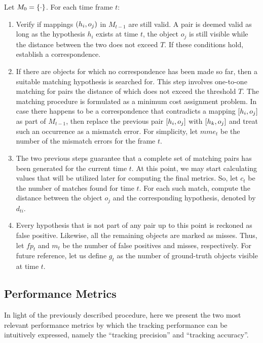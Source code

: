 Let $M_0 = \left\{ {\cdot} \right\}$. For each time frame $t$:
\begin{enumerate}
    \item Verify if mappings $\left( {h_i, o_j} \right)$ in $M_{t - 1}$ are still valid. A pair is deemed valid as long as the hypothesis $h_i$ exists at time $t$, the object $o_j$ is still visible while the distance between the two does not exceed $T$. If these conditions hold, establish a correspondence.
    \item If there are objects for which no correspondence has been made so far, then a suitable matching hypothesis is searched for. This step involves one-to-one matching for pairs the distance of which does not exceed the threshold $T$. The matching procedure is formulated as a minimum cost assignment problem. In case there happens to be a correspondence that contradicts a mapping $\left[ {h_i, o_j} \right]$ as part of $M_{t - 1}$, then replace the previous pair $\left[ {h_i, o_j} \right]$ with $\left[ {h_k, o_j} \right]$ and treat such an occurrence as a mismatch error. For simplicity, let $mme_t$ be the number of the mismatch errors for the frame $t$.
    \item The two previous steps guarantee that a complete set of matching pairs has been generated for the current time $t$. At this point, we may start calculating values that will be utilized later for computing the final metrics. So, let $c_t$ be the number of matches found for time $t$. For each such match, compute the distance between the object $o_j$ and the corresponding hypothesis, denoted by $d_{ti}$.
    \item Every hypothesis that is not part of any pair up to this point is reckoned as false positive. Likewise, all the remaining objects are marked as misses. Thus, let $fp_t$ and $m_t$ be the number of false positives and misses, respectively. For future reference, let us define $g_t$ as the number of ground-truth objects visible at time $t$.
\end{enumerate}

\subsection{Performance Metrics}

In light of the previously described procedure, here we present the two most relevant performance metrics by which the tracking performance can be intuitively expressed, namely the ``tracking precision'' and ``tracking accuracy''.

